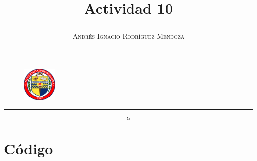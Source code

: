 \documentclass[11pt,spanish]{article}
\title{\vspace{-3cm}\begin{flushleft}\textbf{Actividad 10}\end{flushleft}}
\author{\hspace{-9.6cm}\textsc{Andrés Ignacio Rodríguez Mendoza}}
\date{}
\begin{document}
\begin{figure}
  \begin{center}
   \vspace{-5.4cm} \includegraphics[width=0.15\textwidth]{uni}
  \end{center}
\end{figure}

\maketitle  
\begin{center}
\rule{\textwidth}{1pt}
\end{center}

$$\alpha$$

\section*{Código}
\end{document}
